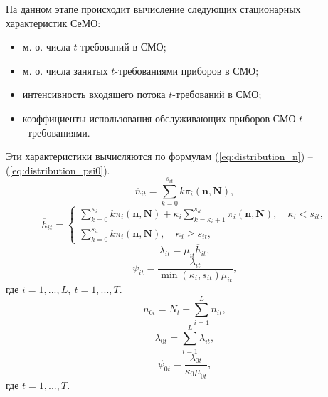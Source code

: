 \documentclass[a4paper,14pt]{extarticle}
\theoremstyle{note}
\begin{document}
На данном этапе происходит вычисление следующих стационарных характеристик СеМО:
\begin{itemize}
\item м. о. числа $t$-требований в СМО;
\item м. о. числа занятых $t$-требованиями приборов в СМО;
\item интенсивность входящего потока $t$-требований в СМО;
\item коэффициенты использования обслуживающих приборов СМО $t$~-~требованиями.
\end{itemize}
Эти характеристики вычисляются по формулам (\ref{eq:distribution_n}) -- (\ref{eq:distribution_psi0}).\\
\begin{equation}
\overline{n}_{it} = \sum\limits_{k=0}^{s_{it}} k \pi_i(\mathbf{n},\mathbf{N}),
 \label{eq:distribution_n}
\end{equation}
\begin{equation}
\overline{h}_{it} = \left\{
 \begin{array}{l}
 \sum\limits_{k=0}^{\kappa_i} k \pi_i(\mathbf{n},\mathbf{N}) + \kappa_i  \sum\limits_{k=\kappa_i + 1}^{s_{it}} \pi_i(\mathbf{n},\mathbf{N}), \quad \kappa_i < s_{it}, \\
 \sum\limits_{k=0}^{s_{it}} k \pi_i(\mathbf{n},\mathbf{N}), \quad \kappa_i \ge s_{it},
 \end{array}
\right.
 \label{eq:distribution_h}
\end{equation}
\begin{equation}
\lambda_{it} = \mu_{it} \overline{h}_{it},
 \label{eq:distribution_lambda}
\end{equation}
\begin{equation}
\psi_{it} = \frac{\lambda_{it}}{\min(\kappa_{i}, s_{it}) \mu_{it}},
 \label{eq:distribution_psi}
\end{equation}
где $i=1,...,L,~t=1,...,T$.
\begin{equation}
\overline{n}_{0t} = N_t - \sum\limits_{i=1}^L \overline{n}_{it},
 \label{eq:distribution_n0}
\end{equation}
\begin{equation}
\lambda_{0t} = \sum\limits_{i=1}^L \lambda_{it},
 \label{eq:distribution_lambda0}
\end{equation}
\begin{equation}
\psi_{0t} = \frac{\lambda_{0t}}{\kappa_0 \mu_{0t}},
 \label{eq:distribution_psi0}
\end{equation}
где $t=1,...,T$.
\end{document}
